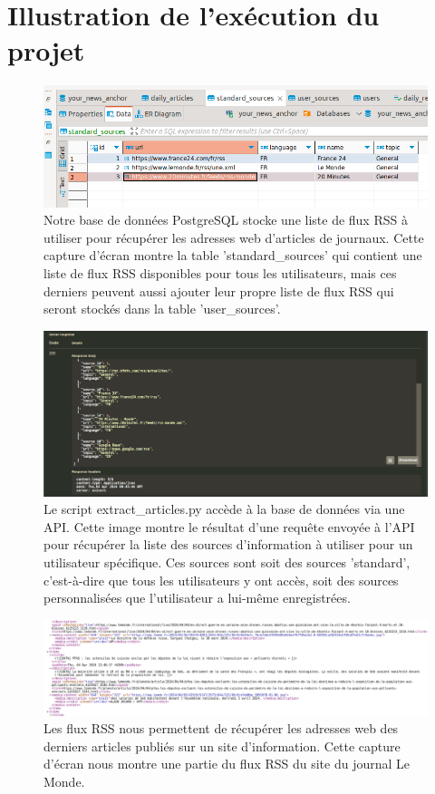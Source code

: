 \documentclass[french]{article}
\begin{document}
    \section*{Illustration de l'exécution du projet}
    \label{img:screenshots_processus}
    \begin{figure}[h!]
        \includegraphics[width=12cm]{db_1}
        \centering
        \caption{Notre base de données PostgreSQL stocke une liste de flux RSS à utiliser pour récupérer les adresses web d'articles de journaux. Cette capture d'écran montre la table 'standard\_sources' qui contient une liste de flux RSS disponibles pour tous les utilisateurs, mais ces derniers peuvent aussi ajouter leur propre liste de flux RSS qui seront stockés dans la table 'user\_sources'.}
        \centering
    \end{figure}
    \label{img:screenshot_api_result}
    \begin{figure}[h!]
        \includegraphics[width=12cm]{api_1}
        \centering
        \caption{Le script extract\_articles.py accède à la base de données via une API. Cette image montre le résultat d'une requête envoyée à l'API pour récupérer la liste des sources d'information à utiliser pour un utilisateur spécifique. Ces sources sont soit des sources 'standard', c'est-à-dire que tous les utilisateurs y ont accès, soit des sources personnalisées que l'utilisateur a lui-même enregistrées.}
        \centering
    \end{figure}
    \begin{figure}[h!]
        \includegraphics[width=12cm]{rss}
        \centering
        \caption{Les flux RSS nous permettent de récupérer les adresses web des derniers articles publiés sur un site d'information. Cette capture d'écran nous montre une partie du flux RSS du site du journal Le Monde.}
        \centering
    \end{figure}
\end{document}
